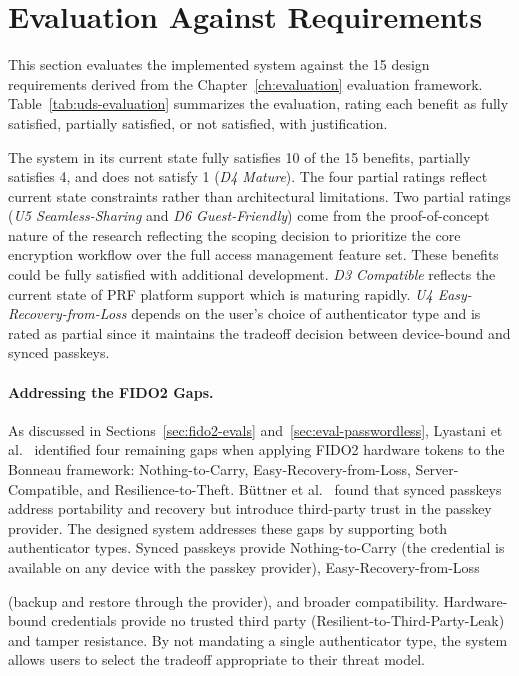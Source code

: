 \section{Evaluation Against Requirements}
\label{sec:eval-requirements}

This section evaluates the implemented system against the 15 design requirements derived from the Chapter~\ref{ch:evaluation} evaluation framework. Table~\ref{tab:uds-evaluation} summarizes the evaluation, rating each benefit as fully satisfied, partially satisfied, or not satisfied, with justification.

The system in its current state fully satisfies 10 of the 15 benefits, partially satisfies 4, and does not satisfy 1 (\emph{D4 Mature}). The four partial ratings reflect current state constraints rather than architectural limitations. Two partial ratings (\emph{U5 Seamless-Sharing} and \emph{D6 Guest-Friendly}) come from the proof-of-concept nature of the research reflecting the scoping decision to prioritize the core encryption workflow over the full access management feature set. These benefits could be fully satisfied with additional development. \emph{D3 Compatible} reflects the current state of PRF platform support which is maturing rapidly. \emph{U4 Easy-Recovery-from-Loss} depends on the user's choice of authenticator type and is rated as partial since it maintains the tradeoff decision between device-bound and synced passkeys.

\paragraph{Addressing the FIDO2 Gaps.} As discussed in Sections~\ref{sec:fido2-evals} and~\ref{sec:eval-passwordless}, Lyastani et al.~\cite{lyastani_fido2_2020} identified four remaining gaps when applying FIDO2 hardware tokens to the Bonneau framework: Nothing-to-Carry, Easy-Recovery-from-Loss, Server-Compatible, and Resilience-to-Theft. B\"uttner et al.~\cite{buttner_passkey_2025} found that synced passkeys address portability and recovery but introduce third-party trust in the passkey provider. The designed system addresses these gaps by supporting both authenticator types. Synced passkeys provide Nothing-to-Carry (the credential is available on any device with the passkey provider), Easy-Recovery-from-Loss



\noindent(backup and restore through the provider), and broader compatibility. Hardware-bound credentials provide no trusted third party (Resilient-to-Third-Party-Leak) and tamper resistance. By not mandating a single authenticator type, the system allows users to select the tradeoff appropriate to their threat model.

